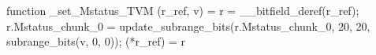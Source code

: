 function _set_Mstatus_TVM (r_ref, v) = {
    r = __bitfield_deref(r_ref);
    r.Mstatus_chunk_0 = update_subrange_bits(r.Mstatus_chunk_0, 20, 20, subrange_bits(v, 0, 0));
    (*r_ref) = r
}
